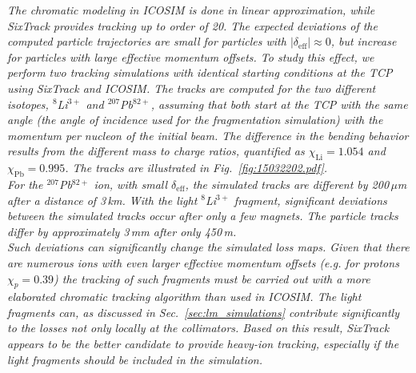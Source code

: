 \textit{The chromatic modeling in ICOSIM is done in linear approximation, while SixTrack provides tracking up to order of 20. The expected deviations of the computed particle trajectories are small for particles with $|\delta_\text{eff}| \approx 0$, but increase for particles with large effective momentum offsets. To study this effect, we perform two tracking simulations with identical starting conditions at the TCP using SixTrack and ICOSIM. The tracks are computed for the two different isotopes, $^{8}$Li$^{3+}$ and $^{207}$Pb$^{82+}$, assuming that both start at the TCP with the same angle (the angle of incidence used for the fragmentation simulation) with the momentum per nucleon of the initial \lead beam. The difference in the bending behavior results from the different mass to charge ratios, quantified as $\chi_\text{Li}=1.054$ and $\chi_\text{Pb}=0.995$. The tracks are illustrated in Fig.~\ref{fig:15032202.pdf}. 
\\
For the $^{207}$Pb$^{82+}$ ion, with small $\delta_\text{eff}$, the simulated tracks are different by 200$\,\mu$m after a distance of 3$\,$km. With the light $^{8}$Li$^{3+}$ fragment, significant deviations between the simulated tracks occur after only a few magnets. The particle tracks differ by approximately 3$\,$mm after only 450$\,$m. 
\\
Such deviations can significantly change the simulated loss maps. Given that there are numerous ions with even larger effective momentum offsets (e.g. for protons $\chi_p = 0.39$) the tracking of such fragments must be carried out with a more elaborated chromatic tracking algorithm than used in ICOSIM. The light fragments can, as discussed in Sec.~\ref{sec:lm_simulations} contribute significantly to the losses not only locally at the collimators. Based on this result, SixTrack appears to be the better candidate to provide heavy-ion tracking, especially if the light fragments should be included in the simulation. }

